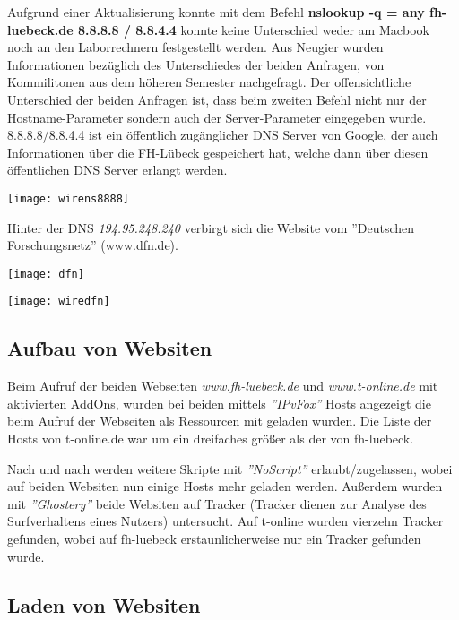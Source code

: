 \documentclass{scrartcl}
\begin{document}
  Aufgrund einer Aktualisierung konnte mit dem Befehl \textbf{nslookup -q = any fh-luebeck.de 8.8.8.8 / 8.8.4.4} konnte keine Unterschied weder am Macbook noch an den Laborrechnern festgestellt werden. Aus Neugier wurden Informationen bezüglich des Unterschiedes der beiden Anfragen, von Kommilitonen aus dem höheren Semester nachgefragt. Der offensichtliche Unterschied der beiden Anfragen ist, dass beim zweiten Befehl nicht nur der Hostname-Parameter sondern auch der Server-Parameter eingegeben wurde. 8.8.8.8/8.8.4.4 ist ein öffentlich zugänglicher DNS Server von Google, der auch Informationen über die FH-Lübeck gespeichert hat, welche dann über diesen öffentlichen DNS Server erlangt werden.
  
    \texttt{[image: wirens8888]}
    \label{fig:wirens8888}
  
  Hinter der DNS \textit{194.95.248.240} verbirgt sich die Website vom ''Deutschen Forschungsnetz'' (www.dfn.de).

    \texttt{[image: dfn]}
    \label{fig:dfn}
  
    \texttt{[image: wiredfn]}
    \label{fig:wiredfn}
  
  \subsection[Aufgabe 6 Aufbau von Websiten]{Aufbau von Websiten}
  
  Beim Aufruf der beiden Webseiten \emph{\textit{www.fh-luebeck.de}} und \emph{\textit{www.t-online.de}} mit aktivierten AddOns, wurden bei beiden mittels \textit{''IPvFox''} Hosts angezeigt die beim Aufruf der Webseiten als Ressourcen mit geladen wurden. Die Liste der Hosts von t-online.de war um ein dreifaches größer als der von fh-luebeck. 
  
  Nach und nach werden weitere Skripte mit \textit{''NoScript''} erlaubt/zugelassen, wobei auf beiden Websiten nun einige Hosts mehr geladen werden. Außerdem wurden mit \textit{''Ghostery''} beide Websiten auf Tracker (Tracker dienen zur Analyse des Surfverhaltens eines Nutzers) untersucht. Auf t-online wurden vierzehn Tracker gefunden, wobei auf fh-luebeck erstaunlicherweise nur ein Tracker gefunden wurde.
  
  \subsection[Aufgabe 7 Laden von Websiten]{Laden von Websiten}
  
\end{document}

